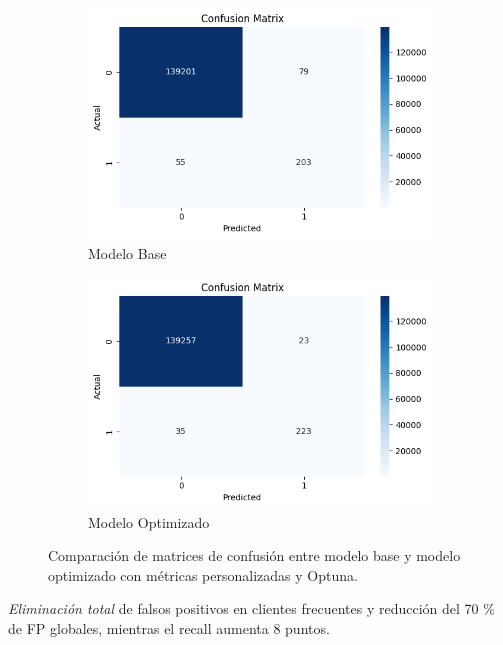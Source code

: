 \documentclass[a4paper,12pt]{article}
\begin{document}
\begin{figure}[H]
    \centering
    \begin{subfigure}[b]{0.45\textwidth}
        \centering
        \includegraphics[width=\textwidth]{figures/base.png}
        \caption{Modelo Base}
        \label{fig:confusion_base}
    \end{subfigure}
    \hfill
    \begin{subfigure}[b]{0.45\textwidth}
        \centering
        \includegraphics[width=\textwidth]{figures/final.png}
        \caption{Modelo Optimizado}
        \label{fig:confusion_optimized}
    \end{subfigure}
    \caption{Comparación de matrices de confusión entre modelo base y modelo optimizado con métricas personalizadas y Optuna.}
    \label{fig:confusion_comparison}
\end{figure}
\textit{Eliminación total} de falsos positivos en clientes frecuentes y reducción del 70 \si{\percent} de FP globales, mientras el recall aumenta 8 puntos.
\end{document}
